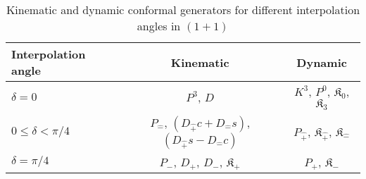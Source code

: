 \documentclass[%
 reprint,
superscriptaddress,
 amsmath,amssymb,
 aps,
]{revtex4-2}
\newcommand{\pT}{\hat{+}}
\newcommand{\mT}{\hat{-}}
\begin{document}
    \begin{center}
        \begin{table*}[t]
  \caption{\label{tab:Kinematic_and_dynamic_generators_for_different_interoplation_angles_conformal1+1}Kinematic and dynamic conformal generators for different interpolation angles in $(1+1)$}
    \begin{ruledtabular}
       \begin{tabular}{lcc}
	Interpolation angle & Kinematic & Dynamic \\
	\hline
	\rule{0pt}{3ex} $\delta=0$ & $P^{3}$, $D$ & $ K^{3}$, $P^{0}$, $\mathfrak{K}_{{0}}$, $\mathfrak{K}_{{3}}$\\
	$0\leq\delta<\pi/4$ &  $P_{\mT}$, $\left(D_{\hat{+}}c+D_{\hat{-}}s\right)$, $\left(D_{\hat{+}}s-D_{\hat{-}}c\right)$ &  $P_{\pT}$, $\mathfrak{K}_{\hat{+}}$, $\mathfrak{K}_{\hat{-}}$\\
	$\delta=\pi/4$ & $P_{-}$, $D_{+}$, $D_{-}$, $\mathfrak{K}_{{+}}$& $P_{+}$, $\mathfrak{K}_{{-}}$\\
      \end{tabular}
    \end{ruledtabular}
\end{table*}
    \end{center}
    
\end{document}
